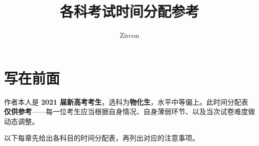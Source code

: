 \documentclass[oneside]{book}
\def\notetitle{各科考试时间分配参考}
\def\noteauthor{Zircon}
\def\notedate{}
\begin{document}
\title{\heiti \LARGE \notetitle \vspace*{8\baselineskip}}
\author{\noteauthor}
\date{\notedate}

\maketitle
\newpage

\chapter*{写在前面}

作者本人是 \textbf{2021 届新高考考生}，选科为\textbf{物化生}，水平中等偏上。此时间分配表\textbf{仅供参考}——每一位考生应当根据自身情况、自身薄弱环节、以及当次试卷难度做动态调整。

以下每章先给出各科目的时间分配表，再列出对应的注意事项。

\setcounter{tocdepth}{1}
\tableofcontents
\newpage







\end{document}
